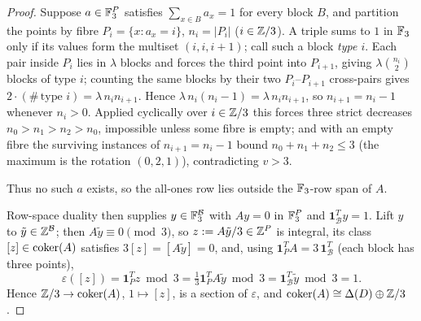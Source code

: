 \begin{proof}
Suppose $a\in\mathbb{F}_3^{P}$ satisfies $\sum_{x\in B}a_x=1$ for every block $B$, and
partition the points by fibre $P_i=\{x:a_x=i\}$, $n_i=|P_i|$ ($i\in\mathbb{Z}/3$). A
triple sums to $1$ in $\mathbb{F}_3$ only if its values form the multiset $(i,i,i+1)$;
call such a block \emph{type $i$}. Each pair inside $P_i$ lies in $\lambda$
blocks and forces the third point into $P_{i+1}$, giving $\lambda\binom{n_i}{2}$
blocks of type $i$; counting the same blocks by their two $P_i$--$P_{i+1}$
cross-pairs gives $2\cdot(\#\,\text{type }i)=\lambda\,n_i n_{i+1}$. Hence
$\lambda\,n_i(n_i-1)=\lambda\,n_i n_{i+1}$, so $n_{i+1}=n_i-1$ whenever $n_i>0$.
Applied cyclically over $i\in\mathbb{Z}/3$ this forces three strict decreases
$n_0>n_1>n_2>n_0$, impossible unless some fibre is empty; and with an empty fibre
the surviving instances of $n_{i+1}=n_i-1$ bound $n_0+n_1+n_2\le3$ (the maximum
is the rotation $(0,2,1)$), contradicting $v>3$.

Thus no such $a$ exists, so the
all-ones row lies outside the $\mathbb{F}_3$-row span of $A$.

Row-space duality then
supplies $y\in\mathbb{F}_3^{\mathcal B}$ with $Ay=0$ in $\mathbb{F}_3^{P}$ and
$\mathbf 1_{\mathcal B}^{T}y=1$. Lift $y$ to $\tilde y\in\mathbb{Z}^{\mathcal B}$; then
$A\tilde y\equiv0\pmod 3$, so $z:=A\tilde y/3\in\mathbb{Z}^{P}$ is integral, its class
$[z]\in\operatorname{coker}(A)$ satisfies $3[z]=[A\tilde y]=0$, and, using
$\mathbf 1_P^{T}A=3\,\mathbf 1_{\mathcal B}^{T}$ (each block has three points),
\[
\varepsilon([z])=\mathbf 1_P^{T}z\bmod 3
=\tfrac{1}{3}\mathbf 1_P^{T}A\tilde y\bmod 3
=\mathbf 1_{\mathcal B}^{T}\tilde y\bmod 3=1 .
\]
Hence $\mathbb{Z}/3\to\operatorname{coker}(A)$, $1\mapsto[z]$, is a section of $\varepsilon$, and
$\operatorname{coker}(A)\cong\Delta(D)\oplus\mathbb{Z}/3$.
\end{proof}
